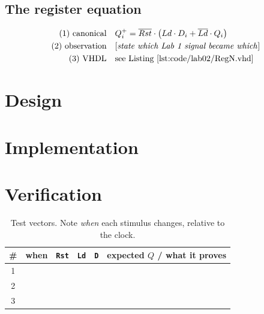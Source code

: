
\subsection*{The register equation}

\begin{align*}
\text{(1) canonical} \quad & Q_i^{+} = \overline{Rst}\cdot\left( Ld\cdot D_i + \overline{Ld}\cdot Q_i \right)\\
\text{(2) observation} \quad & \text{[\emph{state which Lab 1 signal became which}]}\\
\text{(3) VHDL} \quad & \text{see Listing~\ref{lst:code/lab02/RegN.vhd}}
\end{align*}

\section{Design}

\section{Implementation}



\section{Verification}

\begin{table}[htbp]
\centering
\caption{Test vectors. Note \emph{when} each stimulus changes, relative to the clock.}
\label{tab:lab02-vectors}
\begin{tabular}{clllll}
\toprule
\# & when & \texttt{Rst} & \texttt{Ld} & \texttt{D} & expected $Q$ / what it proves \\
\midrule
1 & & & & & \\
2 & & & & & \\
3 & & & & & \\
\bottomrule
\end{tabular}
\end{table}

